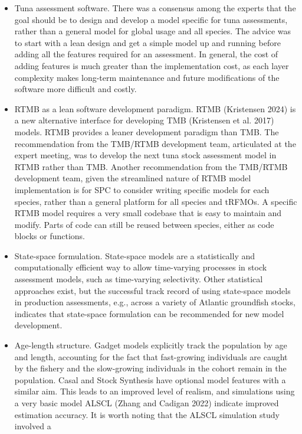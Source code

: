 \documentclass{SCreport}
\begin{document}
\begin{itemize}
  \item Tuna assessment software. There was a consensus among the experts that
  the goal should be to design and develop a model specific for tuna
  assessments, rather than a general model for global usage and all species. The
  advice was to start with a lean design and get a simple model up and running
  before adding all the features required for an assessment. In general, the
  cost of adding features is much greater than the implementation cost, as each
  layer complexity makes long-term maintenance and future modifications of the
  software more difficult and costly.
  \item RTMB as a lean software development paradigm. RTMB (Kristensen 2024) is
  a new alternative interface for developing TMB (Kristensen et al. 2017)
  models. RTMB provides a leaner development paradigm than TMB. The
  recommendation from the TMB/RTMB development team, articulated at the expert
  meeting, was to develop the next tuna stock assessment model in RTMB rather
  than TMB. Another recommendation from the TMB/RTMB development team, given the
  streamlined nature of RTMB model implementation is for SPC to consider writing
  specific models for each species, rather than a general platform for all
  species and tRFMOs. A specific RTMB model requires a very small codebase that
  is easy to maintain and modify. Parts of code can still be reused between
  species, either as code blocks or functions.
  \item State-space formulation. State-space models are a statistically and
  computationally efficient way to allow time-varying processes in stock
  assessment models, such as time-varying selectivity. Other statistical
  approaches exist, but the successful track record of using state-space models
  in production assessments, e.g., across a variety of Atlantic groundfish
  stocks, indicates that state-space formulation can be recommended for new
  model development.
  \item Age-length structure. Gadget models explicitly track the population by
  age and length, accounting for the fact that fast-growing individuals are
  caught by the fishery and the slow-growing individuals in the cohort remain in
  the population. Casal and Stock Synthesis have optional model features with a
  similar aim. This leads to an improved level of realism, and simulations using
  a very basic model ALSCL (Zhang and Cadigan 2022) indicate improved estimation
  accuracy. It is worth noting that the ALSCL simulation study involved a

\end{itemize}
\end{document}
